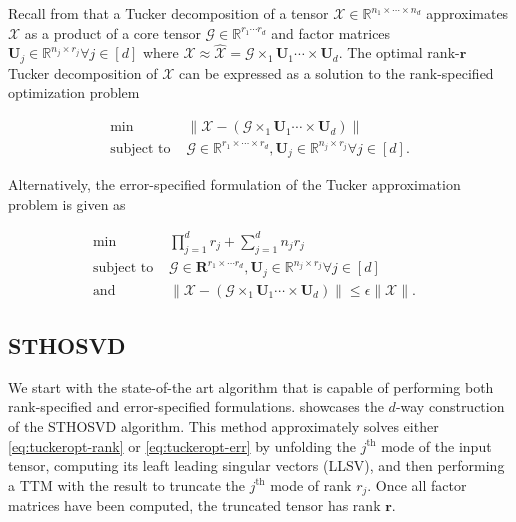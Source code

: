 
Recall from  that a Tucker
decomposition of a tensor $\mathcal{X}\in \mathbb{R}^{n_1\times \cdots \times
n_d}$ approximates $\mathcal{X}$ as a product of a core tensor $\mathcal{G} \in
\mathbb{R}^{r_1 \cdots r_d}$ and factor matrices $\mathbf{U}_j \in
\mathbb{R}^{n_j\times r_j} \forall j \in [d]$ where $\mathcal{X} \approx
\mathcal{\hat{X}} = \mathcal{G} \times_1 \mathbf{U}_1 \cdots \times
\mathbf{U}_d$. The optimal rank-$\mathbf{r}$ Tucker decomposition of
$\mathcal{X}$ can be expressed as a solution to the rank-specified optimization problem

\begin{equation}\label{eq:tuckeropt-rank}
    \begin{aligned}
        \min \quad & \| \mathcal{X} - (\mathcal{G} \times_1 \mathbf{U}_1 \cdots \times \mathbf{U}_d)\| \\ 
        \text{subject to } &\mathcal{G} \in \mathbb{R}^{r_1\times \cdots \times r_d}, \mathbf{U}_{j} \in \mathbb{R}^{n_j\times r_j} \forall j\in [d].
    \end{aligned}
\end{equation}

Alternatively, the error-specified formulation of the Tucker approximation
problem is given as

\begin{equation}\label{eq:tuckeropt-err}
    \begin{aligned}
        \min \quad & \prod_{j=1}^d r_j + \sum_{j=1}^d n_jr_j & \\ 
        \text{subject to } &\mathcal{G} \in \mathbf{R}^{r_1\times \cdots r_d}, \mathbf{U}_{j} \in \mathbb{R}^{n_j\times r_j} \forall j\in [d] \\
        \text{and}\quad  & \| \mathcal{X} - (\mathcal{G} \times_1 \mathbf{U}_1 \cdots \times \mathbf{U}_d) \| \leq \epsilon \|\mathcal{X}\|.
    \end{aligned}
\end{equation}

\subsection{STHOSVD} \label{sec:sthosvd} We start with the state-of-the art
    algorithm that is capable of performing both rank-specified and
    error-specified formulations.  showcases the $d$-way
    construction of the STHOSVD algorithm. This method approximately solves
    either \cref{eq:tuckeropt-rank} or \cref{eq:tuckeropt-err} by unfolding the
    $j^\text{th}$ mode of the input tensor, computing its leaft leading singular
    vectors (LLSV), and then performing a TTM with the result to truncate the
    $j^\text{th}$ mode of rank $r_j$. Once all factor matrices have been
    computed, the truncated tensor has rank $\mathbf{r}$.

